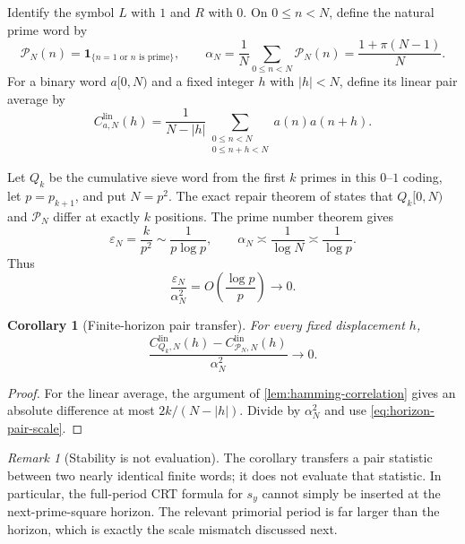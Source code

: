 \documentclass[11pt]{article}
\newtheorem{corollary}[theorem]{Corollary}
\theoremstyle{definition}
\theoremstyle{remark}
\newtheorem{remark}[theorem]{Remark}
\newcommand{\one}{\mathbf 1}
\newcommand{\eps}{\varepsilon}
\begin{document}
Identify the symbol $L$ with $1$ and $R$ with $0$.  On $0\le n<N$, define the natural prime word by
\begin{equation}\label{eq:finite-natural-prime-word}
    \mathcal P_N(n)=\one_{\{n=1\text{ or }n\text{ is prime}\}},
    \qquad
    \alpha_N=\frac1N\sum_{0\le n<N}\mathcal P_N(n)
             =\frac{1+\pi(N-1)}N.
\end{equation}
For a binary word $a[0,N)$ and a fixed integer $h$ with $|h|<N$, define its linear pair average by
\begin{equation}\label{eq:linear-pair-average}
    C^{\mathrm{lin}}_{a,N}(h)
    =\frac1{N-|h|}
      \sum_{\substack{0\le n<N\\0\le n+h<N}}a(n)a(n+h).
\end{equation}

Let $Q_k$ be the cumulative sieve word from the first $k$ primes in this $0$--$1$ coding, let $p=p_{k+1}$, and put $N=p^2$.  The exact repair theorem of \citet{WangPrimeSpectrum2026} states that $Q_k[0,N)$ and $\mathcal P_N$ differ at exactly $k$ positions.  The prime number theorem gives
\begin{equation}\label{eq:horizon-scales}
    \eps_N=\frac{k}{p^2}\sim\frac1{p\log p},
    \qquad
    \alpha_N\asymp\frac1{\log N}\asymp\frac1{\log p}.
\end{equation}
Thus
\begin{equation}\label{eq:horizon-pair-scale}
    \frac{\eps_N}{\alpha_N^2}=O\left(\frac{\log p}{p}\right)\longrightarrow0.
\end{equation}

\begin{corollary}[Finite-horizon pair transfer]\label{cor:horizon-transfer}
For every fixed displacement $h$,
\begin{equation}\label{eq:horizon-linear-transfer}
    \frac{C^{\mathrm{lin}}_{Q_k,N}(h)
          -C^{\mathrm{lin}}_{\mathcal P_N,N}(h)}{\alpha_N^2}
    \longrightarrow0.
\end{equation}
\end{corollary}

\begin{proof}
For the linear average, the argument of \cref{lem:hamming-correlation} gives an absolute difference at most $2k/(N-|h|)$.  Divide by $\alpha_N^2$ and use \eqref{eq:horizon-pair-scale}.
\end{proof}

\begin{remark}[Stability is not evaluation]\label{rem:stability-not-evaluation}
The corollary transfers a pair statistic between two nearly identical finite words; it does not evaluate that statistic.  In particular, the full-period CRT formula for $s_y$ cannot simply be inserted at the next-prime-square horizon.  The relevant primorial period is far larger than the horizon, which is exactly the scale mismatch discussed next.
\end{remark}
\end{document}
